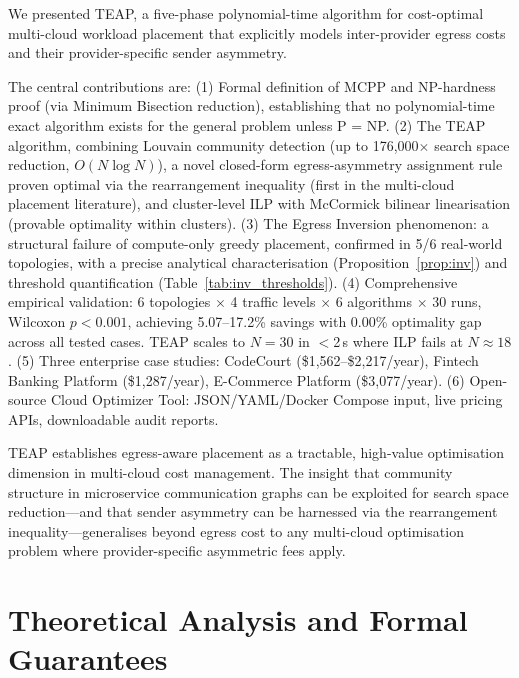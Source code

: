 \documentclass[10pt,journal]{IEEEtran}
\begin{document}
We presented TEAP, a five-phase polynomial-time algorithm for cost-optimal
multi-cloud workload placement that explicitly models inter-provider egress costs
and their provider-specific sender asymmetry.

The central contributions are:
(1) Formal definition of MCPP and NP-hardness proof (via Minimum Bisection reduction),
establishing that no polynomial-time exact algorithm exists for the general problem
unless P = NP.
(2) The TEAP algorithm, combining Louvain community detection (up to 176{,}000$\times$
search space reduction, $O(N\log N)$), a novel closed-form egress-asymmetry
assignment rule proven optimal via the rearrangement inequality (first in the
multi-cloud placement literature), and cluster-level ILP with McCormick
bilinear linearisation (provable optimality within clusters).
(3) The Egress Inversion phenomenon: a structural failure of compute-only
greedy placement, confirmed in 5/6 real-world topologies, with a precise
analytical characterisation (Proposition~\ref{prop:inv}) and
threshold quantification (Table~\ref{tab:inv_thresholds}).
(4) Comprehensive empirical validation: 6 topologies $\times$ 4 traffic levels
$\times$ 6 algorithms $\times$ 30 runs, Wilcoxon $p < 0.001$, achieving
5.07--17.2\% savings with 0.00\% optimality gap across all tested cases.
TEAP scales to $N=30$ in $<$2\,s where ILP fails at $N \approx 18$.
(5) Three enterprise case studies: CodeCourt (\$1,562--\$2,217/year),
Fintech Banking Platform (\$1,287/year), E-Commerce Platform (\$3,077/year).
(6) Open-source Cloud Optimizer Tool: JSON/YAML/Docker Compose input,
live pricing APIs, downloadable audit reports.

TEAP establishes egress-aware placement as a tractable, high-value optimisation
dimension in multi-cloud cost management.
The insight that community structure in microservice communication graphs can
be exploited for search space reduction---and that sender asymmetry can be
harnessed via the rearrangement inequality---generalises beyond egress cost to
any multi-cloud optimisation problem where provider-specific asymmetric fees apply.


\section{Theoretical Analysis and Formal Guarantees}\label{sec:theory}
\end{document}
